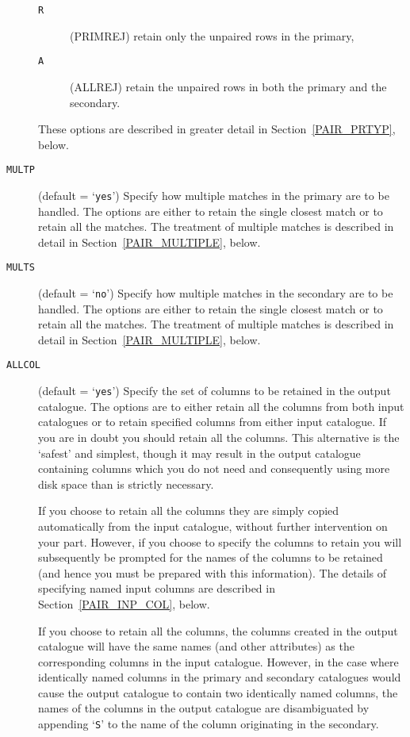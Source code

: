 \documentclass[twoside,11pt]{article}
\renewcommand{\_}{\texttt{\symbol{95}}}
\begin{document}
\begin{description}
\begin{description}
    \item[{\tt R} ] (PRIMREJ) retain only the unpaired rows in the primary,

    \item[{\tt A} ] (ALLREJ) retain the unpaired rows in both the primary
     and the secondary.

  \end{description}

   These options are described in greater detail in Section~\ref{PAIR_PRTYP},
   below.

  \item[ {\tt MULTP} ] (default = `{\tt yes}') Specify how multiple
   matches in the primary are to be handled. The options are either to
   retain the single closest match or to retain all the matches. The
   treatment of multiple matches is described in detail in
   Section~\ref{PAIR_MULTIPLE}, below.

  \item[ {\tt MULTS} ] (default = `{\tt no}') Specify how multiple
   matches in the secondary are to be handled. The options are either to
   retain the single closest match or to retain all the matches. The
   treatment of multiple matches is described in detail in
   Section~\ref{PAIR_MULTIPLE}, below.

  \item[ {\tt ALLCOL} ] (default = `{\tt yes}') Specify the set of
   columns to be retained in the output catalogue. The options are to either
   retain all the columns from both input catalogues or to retain specified
   columns from either input catalogue. If you are in doubt you should
   retain all the columns. This alternative is the `safest' and simplest,
   though it may result in the output catalogue containing columns which you
   do not need and consequently using more disk space than is strictly
   necessary.

   If you choose to retain all the columns they are simply copied
   automatically from the input catalogue, without further intervention on
   your part. However, if you choose to specify the columns to retain you
   will subsequently be prompted for the names of the columns to be retained
   (and hence you must be prepared with this information). The details of
   specifying named input columns are described in Section~\ref{PAIR_INP_COL},
   below.

   If you choose to retain all the columns, the columns created in the output
   catalogue will have the same names (and other attributes) as the
   corresponding columns in the input catalogue. However, in the case where
   identically named columns in the primary and secondary catalogues would
   cause the output catalogue to contain two identically named columns, the
   names of the columns in the output catalogue are disambiguated by
   appending `{\tt \_S}' to the name of the column originating in the
   secondary.


\end{description}
\end{document}
